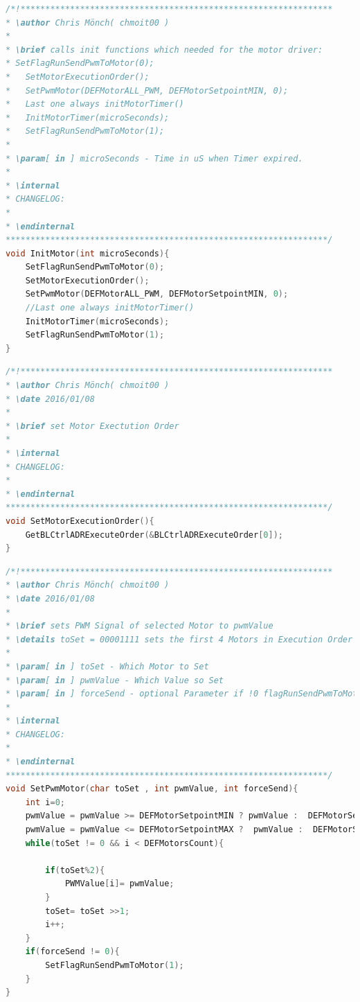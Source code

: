 \begin{lstlisting}[language=C++,firstnumber=21]
/*!***************************************************************
* \author Chris Mönch( chmoit00 )
*
* \brief calls init functions which needed for the motor driver:
* SetFlagRunSendPwmToMotor(0);
*	SetMotorExecutionOrder();
*	SetPwmMotor(DEFMotorALL_PWM, DEFMotorSetpointMIN, 0);
*	Last one always initMotorTimer()
*	InitMotorTimer(microSeconds);
*	SetFlagRunSendPwmToMotor(1);
*
* \param[ in ] microSeconds - Time in uS when Timer expired.
*
* \internal
* CHANGELOG:
*
* \endinternal
*****************************************************************/
void InitMotor(int microSeconds){
	SetFlagRunSendPwmToMotor(0);
	SetMotorExecutionOrder();
	SetPwmMotor(DEFMotorALL_PWM, DEFMotorSetpointMIN, 0);
	//Last one always initMotorTimer()
	InitMotorTimer(microSeconds);
	SetFlagRunSendPwmToMotor(1);
}
\end{lstlisting}

\begin{lstlisting}[language=C++,firstnumber=48]
/*!***************************************************************
* \author Chris Mönch( chmoit00 )
* \date 2016/01/08
*
* \brief set Motor Exectution Order
*
* \internal
* CHANGELOG:
*
* \endinternal
*****************************************************************/
void SetMotorExecutionOrder(){
	GetBLCtrlADRExecuteOrder(&BLCtrlADRExecuteOrder[0]);
}
\end{lstlisting}

\begin{lstlisting}[language=C++,firstnumber=63]
/*!***************************************************************
* \author Chris Mönch( chmoit00 )
* \date 2016/01/08
*
* \brief sets PWM Signal of selected Motor to pwmValue
* \details toSet = 00001111 sets the first 4 Motors in Execution Order to pwmValue
*
* \param[ in ] toSet - Which Motor to Set
* \param[ in ] pwmValue - Which Value so Set
* \param[ in ] forceSend - optional Parameter if !0 flagRunSendPwmToMotor will be set
*
* \internal
* CHANGELOG:
*
* \endinternal
*****************************************************************/
void SetPwmMotor(char toSet , int pwmValue, int forceSend){
	int i=0;
	pwmValue = pwmValue >= DEFMotorSetpointMIN ? pwmValue :  DEFMotorSetpointMIN;
	pwmValue = pwmValue <= DEFMotorSetpointMAX ?  pwmValue :  DEFMotorSetpointMAX;
	while(toSet != 0 && i < DEFMotorsCount){
	
		if(toSet%2){
			PWMValue[i]= pwmValue;
		}
		toSet= toSet >>1;
		i++;
	}
	if(forceSend != 0){
		SetFlagRunSendPwmToMotor(1);
	}
}
\end{lstlisting}

